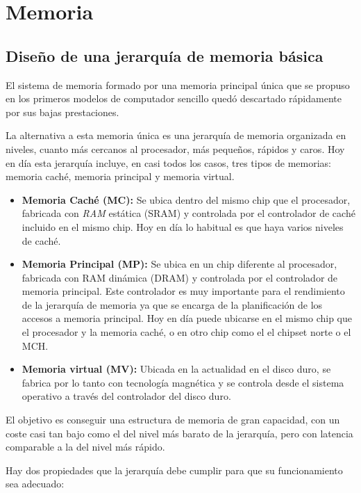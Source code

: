 \section{Memoria}

\subsection{Diseño de una jerarquía de memoria básica}

El sistema de memoria formado por una memoria principal única que se propuso en los primeros modelos de computador sencillo quedó descartado rápidamente por sus bajas prestaciones.

La alternativa a esta memoria única es una jerarquía de memoria organizada en niveles, cuanto más cercanos al procesador, más pequeños, rápidos y caros. Hoy en día esta jerarquía incluye, en casi todos los casos, tres tipos de memorias: memoria caché, memoria principal y memoria virtual.

\begin{itemize}
  \item \textbf{Memoria Caché (MC):} Se ubica dentro del mismo chip que el procesador, fabricada con \textit{RAM} estática (SRAM) y controlada por el controlador de caché incluido en el mismo chip. Hoy en día lo habitual es que haya varios niveles de caché.
  \item \textbf{Memoria Principal (MP):} Se ubica en un chip diferente al procesador, fabricada con RAM dinámica (DRAM) y controlada por el controlador de memoria principal. Este controlador es muy importante para el rendimiento de la jerarquía de memoria ya que se encarga de la planificación de los accesos a memoria principal. Hoy en día puede ubicarse en el mismo chip que el procesador y la memoria caché, o en otro chip como el el chipset norte o el MCH.\@
  \item \textbf{Memoria virtual (MV):} Ubicada en la actualidad en el disco duro, se fabrica por lo tanto con tecnología magnética y se controla desde el sistema operativo a través del controlador del disco duro.
\end{itemize}

El objetivo es conseguir una estructura de memoria de gran capacidad, con un coste casi tan bajo como el del nivel más barato de la jerarquía, pero con latencia comparable a la del nivel más rápido.

Hay dos propiedades que la jerarquía debe cumplir para que su funcionamiento sea adecuado:

